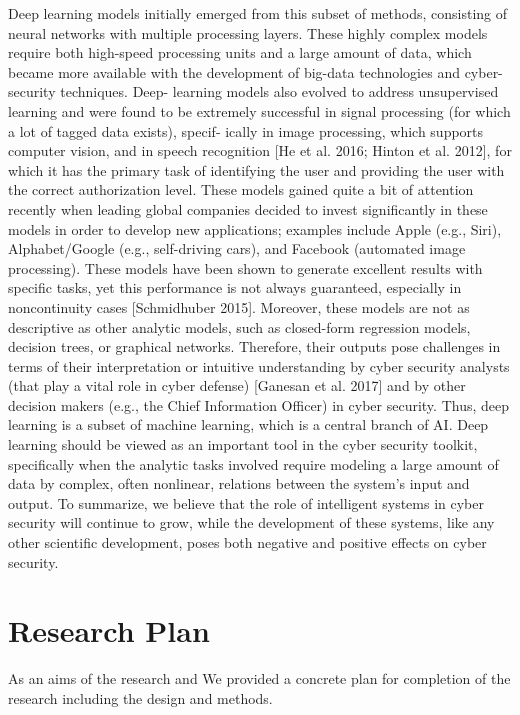 Deep learning models initially emerged from this subset of methods, consisting of neural
networks with multiple processing layers. These highly complex models require both
high-speed processing units and a large amount of data, which became more available
with the development of big-data technologies and cyber-security techniques. Deep-
learning models also evolved to address unsupervised learning and were found to be
extremely successful in signal processing (for which a lot of tagged data exists), specif-
ically in image processing, which supports computer vision, and in speech recognition
[He et al. 2016; Hinton et al. 2012], for which it has the primary task of identifying the
user and providing the user with the correct authorization level. These models gained
quite a bit of attention recently when leading global companies decided to invest 
significantly in these models in order to develop new applications; examples include Apple
(e.g., Siri), Alphabet/Google (e.g., self-driving cars), and Facebook (automated image
processing). These models have been shown to generate excellent results with specific
tasks, yet this performance is not always guaranteed, especially in noncontinuity cases
[Schmidhuber 2015]. Moreover, these models are not as descriptive as other analytic
models, such as closed-form regression models, decision trees, or graphical networks.
Therefore, their outputs pose challenges in terms of their interpretation or intuitive
understanding by cyber security analysts (that play a vital role in cyber defense)
[Ganesan et al. 2017] and by other decision makers (e.g., the Chief Information Officer)
in cyber security. Thus, deep learning is a subset of machine learning, which is a central
branch of AI. Deep learning should be viewed as an important tool in the cyber security
toolkit, specifically when the analytic tasks involved require modeling a large amount
of data by complex, often nonlinear, relations between the system’s input and output.
To summarize, we believe that the role of intelligent systems in cyber security will
continue to grow, while the development of these systems, like any other scientific
development, poses both negative and positive effects on cyber security.



\section{Research Plan}

 As an aims of the research and We provided a concrete plan for completion of the research including the design and methods. 

